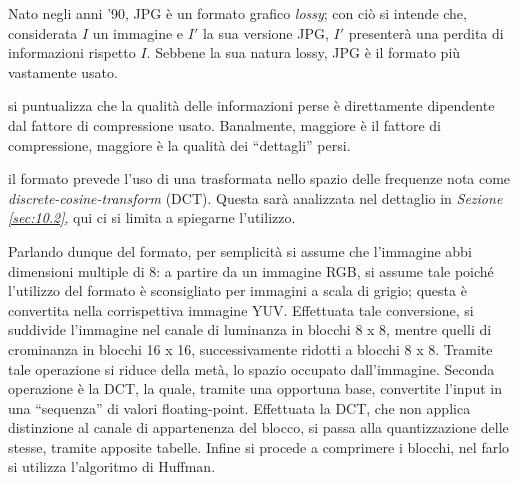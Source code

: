 \documentclass{subfiles}
\begin{document}
\label{sec:6.2}
Nato negli anni '90, JPG è un formato grafico \emph{lossy}; con ciò si intende che, considerata \(I\) un immagine e \(I'\) la sua versione JPG,
\(I'\) presenterà una perdita di informazioni rispetto \(I\). Sebbene la sua natura lossy, JPG è il formato più vastamente usato.

\begin{Remark*}
    si puntualizza che la qualità delle informazioni perse è direttamente dipendente dal fattore di compressione usato. Banalmente,
    maggiore è il fattore di compressione, maggiore è la qualità dei ``dettagli'' persi.
\end{Remark*}

\begin{Note*}
    il formato prevede l'uso di una trasformata nello spazio delle frequenze nota come \emph{discrete-cosine-transform} (DCT).
    Questa sarà analizzata nel dettaglio in \emph{Sezione \ref{sec:10.2}}, qui ci si limita a spiegarne l'utilizzo.
\end{Note*}

Parlando dunque del formato, per semplicità si assume che l'immagine abbi dimensioni multiple di 8:
a partire da un immagine RGB, si assume tale poiché l'utilizzo del formato è sconsigliato per immagini a scala di grigio;
questa è convertita nella corrispettiva immagine YUV. Effettuata tale conversione, si suddivide l'immagine nel canale di luminanza in blocchi 8 x 8,
mentre quelli di crominanza in blocchi 16 x 16, successivamente ridotti a blocchi 8 x 8.
Tramite tale operazione si riduce della metà, lo spazio occupato dall'immagine.
Seconda operazione è la DCT, la quale, tramite una opportuna base, convertite l'input in una ``sequenza'' di valori floating-point.
Effettuata la DCT, che non applica distinzione al canale di appartenenza del blocco, si passa alla quantizzazione delle stesse, tramite apposite tabelle.
Infine si procede a comprimere i blocchi, nel farlo si utilizza l'algoritmo di Huffman.
\end{document}

